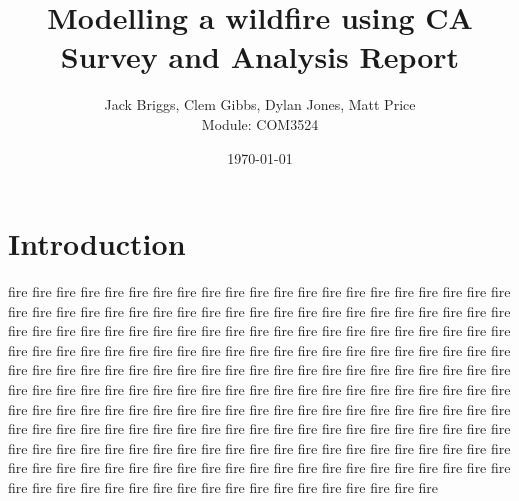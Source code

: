 \documentclass[11pt,a4paper]{article}
\title{Modelling a wildfire using CA\\[0.6em]
	\large Survey and Analysis Report}
\author{Jack Briggs, Clem Gibbs, Dylan Jones, Matt Price\\[0.3em]
	Module: COM3524}
\date{\today}
\begin{document}
	
	\maketitle

	\begin{abstract}
		
	\end{abstract}
	
	\tableofcontents
	\clearpage
	

	\section{Introduction}\label{sec:intro}
	fire fire fire fire fire fire fire fire fire fire fire fire fire fire fire fire fire fire fire fire fire fire fire fire fire fire fire fire fire fire fire fire fire fire fire fire fire fire fire fire fire fire fire fire fire fire fire fire fire fire fire fire fire fire fire fire fire fire fire fire fire fire fire fire fire fire fire fire fire fire fire fire fire fire fire fire fire fire fire fire fire fire fire fire fire fire fire fire fire fire fire fire fire fire fire fire fire fire fire fire fire fire fire fire fire fire fire fire fire fire fire fire fire fire fire fire fire fire fire fire fire fire fire fire fire fire fire fire fire fire fire fire fire fire fire fire fire fire fire fire fire fire fire fire fire fire fire fire fire fire fire fire fire fire fire fire fire fire fire fire fire fire fire fire fire fire fire fire fire fire fire fire fire fire fire fire fire fire fire fire fire fire fire fire fire fire fire fire fire fire fire fire fire fire fire fire fire fire fire fire fire fire fire fire fire fire fire fire fire fire fire fire fire fire fire fire fire fire fire fire fire fire fire fire fire fire fire fire 
	\citet{examplearticle}
	
	
\end{document}
